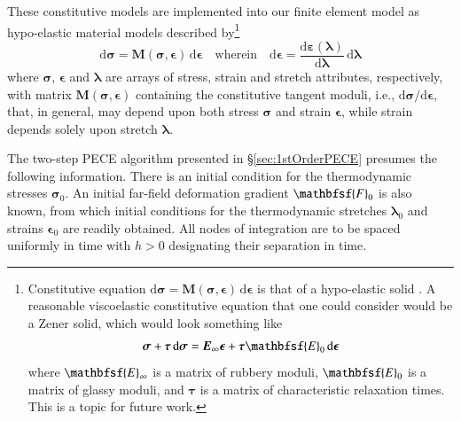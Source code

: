 These constitutive models are implemented into our finite element model as hypo-elastic material models \cite{Truesdell55} described by\footnote{
    Constitutive equation $\mathrm{d} \boldsymbol{\sigma} = \mathbf{M} ( \boldsymbol{\sigma}, \boldsymbol{\epsilon} ) \, \mathrm{d} \boldsymbol{\epsilon}$ is that of a hypo-elastic solid \cite{Truesdell55}.  A reasonable visco\-elastic constitutive equation that one could consider would be a Zener \cite{Zener48} solid, which would look something like
    $$ \boldsymbol{\sigma} + \boldsymbol{\tau} \, \mathrm{d} \boldsymbol{\sigma} = \boldsymbol{E}_{\infty} \boldsymbol{\epsilon} + \boldsymbol{\tau} \mathbfsf{E}_0 \, \mathrm{d} \boldsymbol{\epsilon} $$ 
    where $\mathbfsf{E}_{\infty}$ is a matrix of rubbery moduli, $\mathbfsf{E}_0$ is a matrix of glassy moduli, and $\boldsymbol{\tau}$ is a matrix of characteristic relaxation times.  This is a topic for future work.
}
\begin{equation}
\mathrm{d} \boldsymbol{\sigma} = \mathbf{M} ( \boldsymbol{\sigma}, \boldsymbol{\epsilon} ) \, \mathrm{d} \boldsymbol{\epsilon} 
\quad \text{wherein} \quad
\mathrm{d} \boldsymbol{\epsilon} = 
\frac{\mathrm{d} \boldsymbol{\varepsilon} ( \boldsymbol{\lambda} )}
{\mathrm{d} \boldsymbol{\lambda}} \, \mathrm{d} \boldsymbol{\lambda}
\label{hypoelastic}
\end{equation}
where $\boldsymbol{\sigma}$, $\boldsymbol{\epsilon}$ and $\boldsymbol{\lambda}$ are arrays of stress, strain and stretch attributes, respectively, with matrix $\mathbf{M} ( \boldsymbol{\sigma}, \boldsymbol{\epsilon} )$ containing the constitutive tangent moduli, i.e., $\mathrm{d} \boldsymbol{\sigma} / \mathrm{d} \boldsymbol{\epsilon}$, that, in general, may depend upon both stress $\boldsymbol{\sigma}$ and strain $\boldsymbol{\epsilon}$, while strain depends solely upon stretch $\boldsymbol{\lambda}$.

The two-step PECE algorithm presented in \S\ref{sec:1stOrderPECE} presumes the following information.  There is an initial condition for the thermo\-dynamic stresses $\boldsymbol{\sigma}_0$.  An initial far-field deformation gradient $\mathbfsf{F}_0$ is also known, from which initial conditions for the thermo\-dynamic stretches $\boldsymbol{\lambda}_0$ and strains $\boldsymbol{\epsilon}_0$ are readily obtained.  All nodes of integration are to be spaced uniformly in time with $h>0$ designating their separation in time.  

